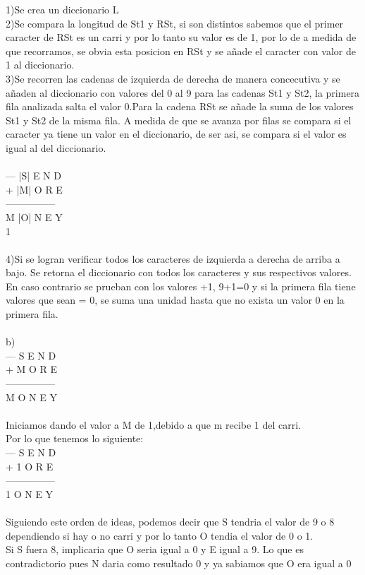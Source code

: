 \documentclass[a4paper,12pt]{article}
\begin{document}
1)Se crea un diccionario L\\
2)Se compara la longitud de St1 y RSt, si son distintos sabemos que el primer caracter de RSt es un carri y por lo tanto su valor es de 1, por lo de a medida de que recorramos, se obvia esta posicion en RSt y se añade el caracter con valor de 1 al diccionario.\\
3)Se recorren las cadenas de izquierda de derecha de manera concecutiva y se añaden al diccionario con valores del 0 al 9 para las cadenas St1 y St2, la primera fila analizada salta el valor 0.Para la cadena RSt se añade la suma de los valores St1 y St2 de la misma fila. A medida de que se avanza por filas se compara si el caracter ya tiene un valor en el diccionario, de ser asi, se compara si el valor es igual al del diccionario.\\\\
--- |S| E N D\\
+ |M| O R E\\
---------------\\
M |O| N E Y\\
1\\\\
4)Si se logran verificar todos los caracteres de izquierda a derecha de arriba a bajo.
Se retorna el diccionario con todos los caracteres y sus respectivos valores.
En caso contrario se prueban con los valores +1, 9+1=0 y si la primera fila tiene valores que sean = 0, se suma una unidad hasta que no exista un valor 0 en la primera fila.\\\\
b)\\
--- S E N D\\
+ M O R E\\
---------------\\
M O N E Y\\\\
Iniciamos dando el valor a M de 1,debido a que m recibe 1 del carri.\\
Por lo que tenemos lo siguiente:\\
--- S E N D\\
+ 1 O R E\\
---------------\\
1 O N E Y\\\\
Siguiendo este orden de ideas, podemos decir que S tendria el valor de 9 o 8 dependiendo si hay o no carri y por lo tanto O tendia el valor de 0 o 1.\\
Si S fuera 8, implicaria que O seria igual a 0 y E igual a 9. Lo que es contradictorio pues N daria como resultado 0 y ya sabiamos que O era igual a 0\\
\end{document}

